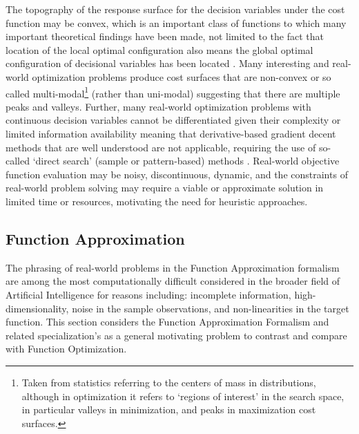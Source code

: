 The topography of the response surface for the decision variables under the cost function may be convex, which is an important class of functions to which many important theoretical findings have been made, not limited to the fact that location of the local optimal configuration also means the global optimal configuration of decisional variables has been located \cite{Boyd2004}. Many interesting and real-world optimization problems produce cost surfaces that are non-convex or so called multi-modal\footnote{Taken from statistics referring to the centers of mass in distributions, although in optimization it refers to `regions of interest' in the search space, in particular valleys in minimization, and peaks in maximization cost surfaces.} (rather than uni-modal) suggesting that there are multiple peaks and valleys. Further, many real-world optimization problems with continuous decision variables cannot be differentiated given their complexity or limited information availability meaning that derivative-based gradient decent methods that are well understood are not applicable, requiring the use of so-called `direct search' (sample or pattern-based) methods \cite{Lewis2000}. Real-world objective function evaluation may be noisy, discontinuous, dynamic, and the constraints of real-world problem solving may require a viable or approximate solution in limited time or resources, motivating the need for heuristic approaches.


% 
%
\subsection{Function Approximation}
\label{subsec:function_approximation}
The phrasing of real-world problems in the Function Approximation formalism are among the most computationally difficult considered in the broader field of Artificial Intelligence for reasons including: incomplete information, high-dimensionality, noise in the sample observations, and non-linearities in the target function.
This section considers the Function Approximation Formalism and related specialization's as a general motivating problem to contrast and compare with Function Optimization.

%
%
